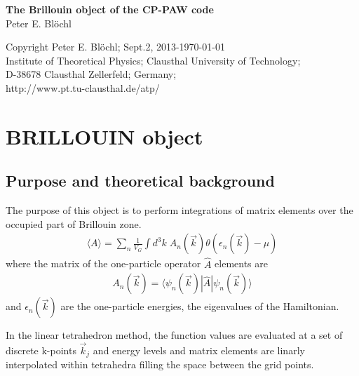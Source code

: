 \documentclass[11pt,a4paper]{report}
\begin{document}
\begin{titlepage}
\begin{center}
\vspace*{3.5cm}
{\huge \textbf{The Brillouin object of the CP-PAW code}}\\
\vspace{0.5cm}
{\large Peter E. Bl\"ochl}
\vspace{0.5cm} 
\end{center}

\vfill
\begin{center}
Copyright Peter E. Bl\"ochl; Sept.2, 2013-\today\\
{\small
Institute of Theoretical Physics;
Clausthal University of Technology;\\ 
D-38678 Clausthal Zellerfeld; Germany;\\
http://www.pt.tu-clausthal.de/atp/}
\end{center}
\end{titlepage}
\noindent            
\tableofcontents
\chapter{BRILLOUIN object}
\section{Purpose and theoretical background}
The purpose of this object is to perform integrations of matrix
elements over the occupied part of Brillouin zone.
\begin{eqnarray}
\langle A\rangle=\sum_n \frac{1}{V_G}\int d^3k\;
A_n(\vec{k})\theta(\epsilon_n(\vec{k})-\mu)
\end{eqnarray}
where the matrix of the one-particle operator $\hat{A}$ elements are
\begin{eqnarray}
A_n(\vec{k})=\langle\psi_n(\vec{k})|\hat{A}|\psi_n(\vec{k})\rangle
\end{eqnarray}
and $\epsilon_n(\vec{k})$ are the one-particle energies, the
eigenvalues of the Hamiltonian.

In the linear tetrahedron method\cite{jepsen71_ssc9_1763,
  lehmann72_pssb54_469, bloechl94_prb49_16223}, the function values
are evaluated at a set of discrete k-points $\vec{k}_j$ and energy
levels and matrix elements are linarly interpolated within tetrahedra
filling the space between the grid points.
\end{document}
